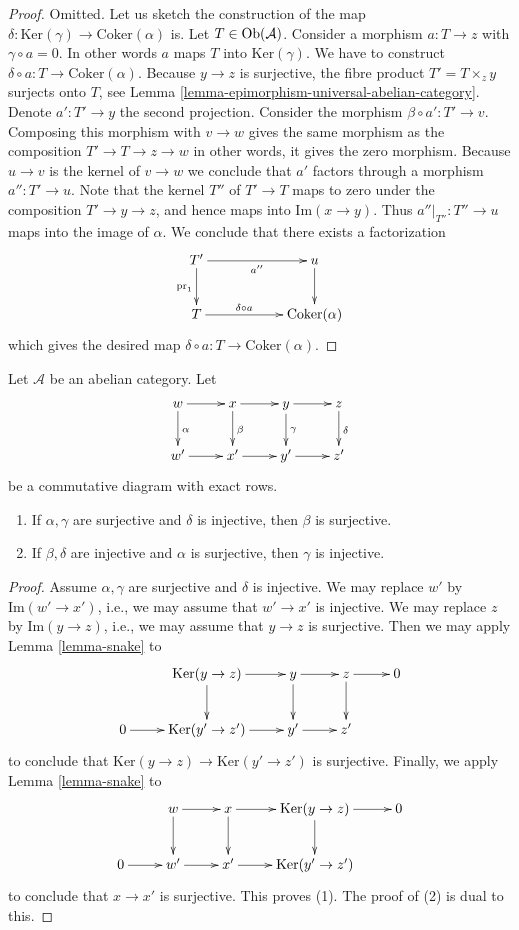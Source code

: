 \begin{proof}
Omitted. Let us sketch the construction of the map
$\delta : \text{Ker}(\gamma) \to \text{Coker}(\alpha)$ is.
Let $T \in \mathop{\rm Ob}\nolimits(\mathcal{A})$. Consider
a morphism $a : T \to z$ with $\gamma \circ a = 0$.
In other words $a$ maps $T$ into $\text{Ker}(\gamma)$.
We have to construct $\delta \circ a : T \to \text{Coker}(\alpha)$.
Because $y \to z$ is surjective, the fibre product
$T' = T \times_z y$ surjects onto $T$, see
Lemma \ref{lemma-epimorphism-universal-abelian-category}.
Denote $a' : T' \to y$ the second projection. Consider
the morphism $\beta \circ a' : T' \to v$.
Composing this morphism with $v \to w$ gives the
same morphism as the composition $T' \to T \to z \to w$
in other words, it gives the zero morphism.
Because $u \to v$ is the kernel of $v \to w$ we conclude
that $a'$ factors through a morphism $a'' : T' \to u$.
Note that the kernel $T''$ of $T' \to T$ maps to
zero under the composition $T' \to y \to z$, and
hence maps into $\text{Im}(x \to y)$. Thus
$a''|_{T''} : T'' \to u$ maps into the image
of $\alpha$. We conclude that there exists a
factorization
$$
\xymatrix{
T' \ar[rr]_-{a''} \ar[d]_{\text{pr}_1} & &
u \ar[d] \\
T \ar[rr]^-{\delta \circ a} & &
\text{Coker}(\alpha)
}
$$
which gives the desired map $\delta \circ a : T \to \text{Coker}(\alpha)$.
\end{proof}

\begin{lemma}
\label{lemma-four-lemma}
Let $\mathcal{A}$ be an abelian category. Let
$$
\xymatrix{
w \ar[r] \ar[d]^\alpha & x \ar[r] \ar[d]^\beta & y \ar[r] \ar[d]^\gamma &
z \ar[d]^\delta \\
w' \ar[r] & x' \ar[r] & y' \ar[r] & z'
}
$$
be a commutative diagram with exact rows.
\begin{enumerate}
\item If $\alpha, \gamma$ are surjective and $\delta$ is injective, then
$\beta$ is surjective.
\item If $\beta, \delta$ are injective and $\alpha$ is surjective, then
$\gamma$ is injective.
\end{enumerate}
\end{lemma}

\begin{proof}
Assume $\alpha, \gamma$ are surjective and $\delta$ is injective.
We may replace $w'$ by $\text{Im}(w' \to x')$, i.e., we may assume
that $w' \to x'$ is injective.
We may replace $z$ by $\text{Im}(y \to z)$, i.e., we may assume that
$y \to z$ is surjective. Then we may apply
Lemma \ref{lemma-snake}
to
$$
\xymatrix{
& \text{Ker}(y \to z) \ar[r] \ar[d] & y \ar[r] \ar[d] & z \ar[r] \ar[d] & 0 \\
0 \ar[r] & \text{Ker}(y' \to z') \ar[r] & y' \ar[r] & z'
}
$$
to conclude that $\text{Ker}(y \to z) \to \text{Ker}(y' \to z')$ is
surjective. Finally, we apply
Lemma \ref{lemma-snake}
to
$$
\xymatrix{
& w \ar[r] \ar[d] & x \ar[r] \ar[d] & \text{Ker}(y \to z) \ar[r] \ar[d] & 0 \\
0 \ar[r] & w' \ar[r] & x' \ar[r] & \text{Ker}(y' \to z')
}
$$
to conclude that $x \to x'$ is surjective. This proves (1). The proof
of (2) is dual to this.
\end{proof}

